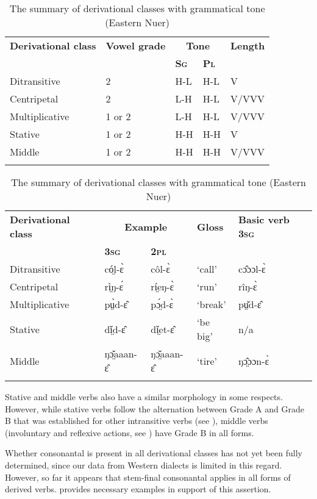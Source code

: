 \documentclass[output=paper,newtxmath,modfonts,nonflat,draftmode]{langsci/langscibook}
\begin{document}
\begin{table}
\begin{tabularx}{\textwidth}{p{45mm}p{30mm}@{}Xll}
\lsptoprule

\bfseries Derivational class & \bfseries Vowel grade & \multicolumn{2}{c}{\bfseries Tone} & {\bfseries Length}\\
&  & \bfseries\scshape Sg & {\bfseries\scshape Pl} &\\
\midrule
Ditransitive & 2 & H-L & H-L & V\\
Centripetal & 2 & L-H & H-L & V/VVV\\
Multiplicative & 1 or 2 & L-H & H-L & V/VVV\\
Stative & 1 or 2 & H-H & H-H & V\\
Middle & 1 or 2 & H-H & H-H & V/VVV\\
\lspbottomrule
\end{tabularx}
\begin{tabularx}{\textwidth}{p{45mm}llll}
\bfseries Derivational class & \multicolumn{2}{c}{\bfseries Example} & \bfseries Gloss & {\bfseries Basic  verb 3\textsc{sg}} \\
& \bfseries\scshape 3sg & {\bfseries\scshape 2pl} &  & \\
\midrule
Ditransitive & có̤l-ɛ̀ & côl-ɛ̀ & ‘call’ & cɔ̂ɔɔl-ɛ̀\\
Centripetal & rì̤ŋ-ɛ́ & rí̤eŋ-ɛ̀& ‘run’ & rîŋ-ɛ̀\\
Multiplicative & pṳ̀d-ɛ̂ & pɔ̤́d-ɛ̀ & ‘break’ & pṳ̌d-ɛ̂\\
Stative & dǐ̤d-ɛ̂ & dǐ̤et-ɛ̂ & ‘be big’ & n/a\\
Middle & ŋɔ̤̌aaan-ɛ̂ & ŋɔ̤̌aaan-ɛ̂ & ‘tire’ & ŋɔ̤̂ɔɔn-ɛ̀\\
\lspbottomrule
\end{tabularx}
\caption{The summary of derivational classes with grammatical tone (Eastern Nuer)}
\label{tab:monich:15}
\end{table}

Stative and middle verbs also have a similar morphology in some respects. However, while stative verbs follow the alternation between Grade A and Grade B that was established for other intransitive verbs (see ), middle verbs (involuntary and reflexive actions, see ) have Grade B in all forms.

Whether consonantal  is present in all derivational classes has not yet been fully determined, since our data from Western  dialects is limited in this regard. However, so far it appears that stem-final consonantal  applies in all forms of derived verbs.  provides necessary examples in support of this assertion. 
\end{document}
